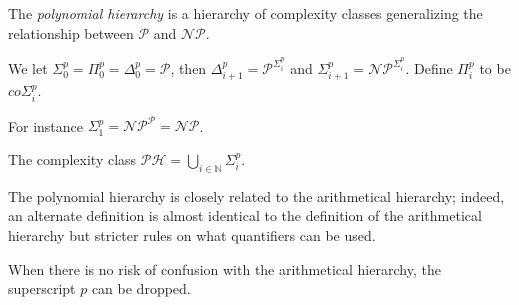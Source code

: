 \documentclass[12pt]{article}
\begin{document}
The \emph{polynomial hierarchy} is a hierarchy of complexity classes generalizing the relationship between $\mathcal{P}$ and $\mathcal{NP}$.

We let $\Sigma^p_0=\Pi^p_0=\Delta^p_0=\mathcal{P}$, then $\Delta^p_{i+1}=\mathcal{P}^{\Sigma^p_i}$ and $\Sigma^p_{i+1}=\mathcal{NP}^{\Sigma^p_i}$.  Define $\Pi^p_i$ to be  $co\Sigma^p_i$.

For instance $\Sigma^p_1=\mathcal{NP}^\mathcal{P}=\mathcal{NP}$.

The complexity class $\mathcal{PH}=\bigcup_{i\in\mathbb{N}} \Sigma^p_i$.

The polynomial hierarchy is closely related to the arithmetical hierarchy; indeed, an alternate definition is almost identical to the definition of the arithmetical hierarchy but stricter rules on what quantifiers can be used.

When there is no risk of confusion with the arithmetical hierarchy, the superscript $p$ can be dropped.
\end{document}
